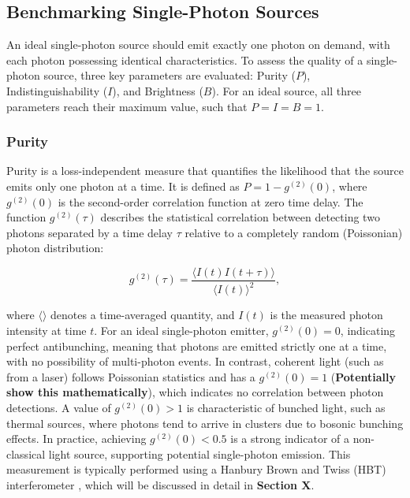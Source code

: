\subsection{Benchmarking Single-Photon Sources}

An ideal single-photon source should emit exactly one photon on demand, with each photon possessing identical characteristics. To assess the quality of a single-photon source, three key parameters are evaluated: Purity ($P$), Indistinguishability ($I$), and Brightness ($B$). For an ideal source, all three parameters reach their maximum value, such that $ P = I = B = 1 $.

\subsubsection{Purity}
Purity is a loss-independent measure that quantifies the likelihood that the source emits only one photon at a time. It is defined as $P = 1 - g^{(2)}(0)$, where $g^{(2)}(0)$ is the second-order correlation function at zero time delay. The function $g^{(2)}(\tau)$ describes the statistical correlation between detecting two photons separated by a time delay $\tau$ relative to a completely random (Poissonian) photon distribution:

\begin{equation}
    g^{(2)}(\tau) = \frac{\langle I(t)I(t+\tau)\rangle}{\langle I(t)\rangle^2},
    \label{eqn:g2}
\end{equation}

where $\langle \rangle$ denotes a time-averaged quantity, and $I(t)$ is the measured photon intensity at time $t$. For an ideal single-photon emitter, $g^{(2)}(0) = 0$, indicating perfect antibunching, meaning that photons are emitted strictly one at a time, with no possibility of multi-photon events. In contrast, coherent light (such as from a laser) follows Poissonian statistics and has a $g^{(2)}(0) = 1$ (\textbf{Potentially show this mathematically}), which indicates no correlation between photon detections. A value of $g^{(2)}(0) > 1$ is characteristic of bunched light, such as thermal sources, where photons tend to arrive in clusters due to bosonic bunching effects. In practice, achieving $g^{(2)}(0) < 0.5$ is a strong indicator of a non-classical light source, supporting potential single-photon emission. This measurement is typically performed using a Hanbury Brown and Twiss (HBT) interferometer \cite{Brown1956}, which will be discussed in detail in \textbf{Section X}. 

